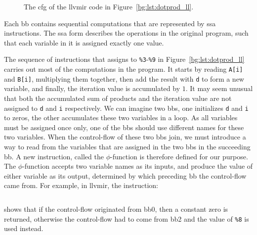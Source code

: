 \begin{figure}[ht]
    \centering
    \caption{%
        The \gls{cfg} of the \gls{llvmir} code in
        Figure~\ref{bg:lst:dotprod_ll}.
    }\label{bg:fig:dotprod_cfg}
\end{figure}

Each \gls{bb} contains sequential computations that are represented by
\gls{ssa} instructions.  The \gls{ssa} form describes the operations in the
original program, such that each variable in it is assigned exactly one value.

The sequence of instructions that assigns to \verb|%3|-\verb|%9| in
Figure~\ref{bg:lst:dotprod_ll} carries out most of the computations in the
program.  It starts by reading \verb|A[i]| and \verb|B[i]|, multiplying them
together, then add the result with \verb|d| to form a new variable, and
finally, the iteration value is accumulated by $1$.  It may seem unusual that
both the accumulated sum of products and the iteration value are not assigned
to \verb|d| and \verb|i| respectively.  We can imagine two \glspl{bb}, one
initializes \verb|d| and \verb|i| to zeros, the other accumulates these two
variables in a loop.  As all variables must be assigned once only, one of
the \glspl{bb} should use different names for these two variables.  When the
control-flow of these two \glspl{bb} join, we must introduce a way to read
from the variables that are assigned in the two \glspl{bb} in the succeeding
\gls{bb}\@.  A new instruction, called the $\phi$-function is therefore defined
for our purpose.  The $\phi$-function accepts two variable names as its inputs,
and produce the value of either variable as its output, determined by which
preceding \gls{bb} the control-flow came from.  For example, in \gls{llvmir},
the instruction:
\begin{lstlisting}[language=LLVM]
    %d.01 = phi float [ 0.000000e+00, %0 ], [ %8, %2 ]
\end{lstlisting}\vspace{-15pt}
shows that if the control-flow originated from \gls{bb}0, then a constant zero
is returned, otherwise the control-flow had to come from \gls{bb}2 and the
value of \verb|%8| is used instead.

